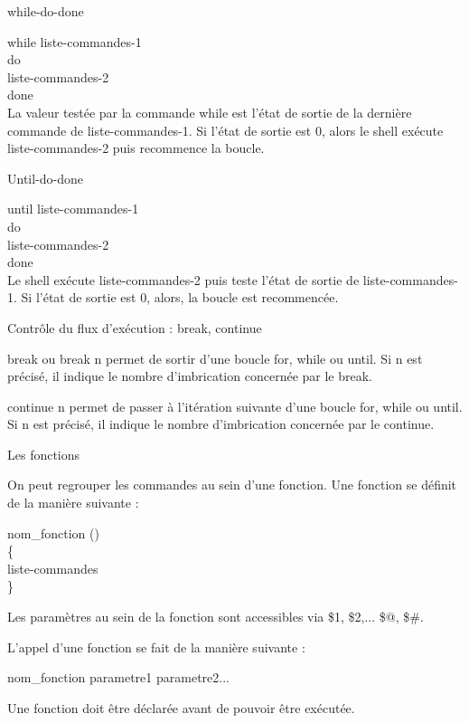 \documentclass[10pt]{beamer}
\begin{document}
\begin{frame}{while-do-done}

\alert{while} liste-commandes-1 \\
\alert{do} \\
liste-commandes-2 \\
\alert{done}\\

La valeur testée par la commande while est l’état de sortie de la dernière commande de liste-commandes-1. Si l’état de sortie est 0,
alors le shell exécute liste-commandes-2 puis recommence la boucle.
\end{frame}
\begin{frame}{Until-do-done}

\alert{until} liste-commandes-1\\
\alert{do}\\
liste-commandes-2\\
\alert{done}\\

Le shell exécute liste-commandes-2 puis teste l’état de sortie de liste-commandes-1. Si l’état de sortie est 0, alors, la boucle est recommencée.
\end{frame}

\begin{frame}{Contrôle du flux d’exécution : break, continue}
  
\begin{alertblock}{break ou break n}
  permet de sortir d’une boucle for, while ou until. Si n est précisé, il indique le nombre d’imbrication concernée par le break.
\end{alertblock}

\pause

\begin{alertblock}{continue n}
permet de passer à l’itération suivante d’une boucle for, while ou until. Si n est précisé, il indique le nombre d’imbrication concernée par le continue.
\end{alertblock}

\end{frame}

\begin{frame}{Les fonctions}

  On peut regrouper les commandes au sein d’une fonction. Une fonction se définit de la manière suivante :
  \begin{alertblock}
nom\_fonction ()\\
\{\\
liste-commandes \\
\}\\
  \end{alertblock}
Les paramètres au sein de la fonction sont accessibles via \$1, \$2,... \$@, \$\#. 

L’appel d’une fonction se fait de la manière suivante :
\begin{center}
nom\_fonction parametre1 parametre2...
\end{center}

Une fonction doit être déclarée avant de pouvoir être exécutée.
\end{frame}
\end{document}
